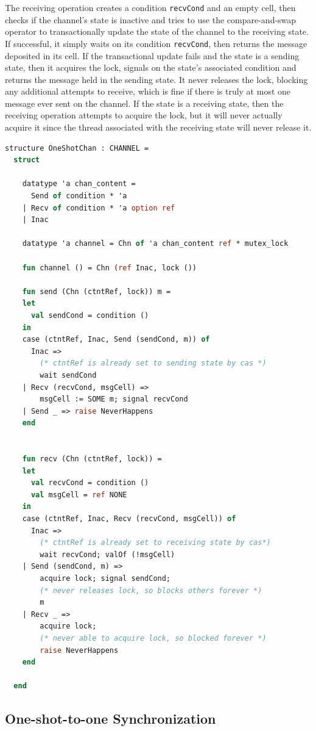 \documentclass[letterpaper, 11pt]{extarticle}
\begin{document}
The receiving operation creates a condition \lstinline{recvCond} and an empty cell,
then checks if the channel's state is inactive and tries to use the
compare-and-swap operator to transactionally update the state of the channel to
the receiving state.  If successful, it simply waits on its condition \lstinline{recvCond},
then returns the message deposited in its cell.
If the transactional update fails and the state is a sending state,
then it acquires the lock, signals on the state's associated condition and returns the message
held in the sending state.  It never releases the lock, blocking any additional attempts to receive,
which is fine if there is truly at most one message ever sent on the channel.
If the state is a receiving state, then the receiving operation attempts to acquire the lock,
but it will never actually acquire it since the thread associated with the receiving state will
never release it.


\begin{lstlisting}[language=ML, mathescape]
  structure OneShotChan : CHANNEL =
  struct

    datatype 'a chan_content =
      Send of condition * 'a
    | Recv of condition * 'a option ref
    | Inac  

    datatype 'a channel = Chn of 'a chan_content ref * mutex_lock

    fun channel () = Chn (ref Inac, lock ())

    fun send (Chn (ctntRef, lock)) m =
    let
      val sendCond = condition ()
    in
    case (ctntRef, Inac, Send (sendCond, m)) of
      Inac =>
        (* ctntRef is already set to sending state by cas *)
        wait sendCond
    | Recv (recvCond, msgCell) =>
        msgCell := SOME m; signal recvCond
    | Send _ => raise NeverHappens
    end


    fun recv (Chn (ctntRef, lock)) =
    let
      val recvCond = condition ()
      val msgCell = ref NONE 
    in
    case (ctntRef, Inac, Recv (recvCond, msgCell)) of
      Inac =>
        (* ctntRef is already set to receiving state by cas*)
        wait recvCond; valOf (!msgCell)
    | Send (sendCond, m) =>
        acquire lock; signal sendCond;
        (* never releases lock, so blocks others forever *)
        m
    | Recv _ =>
        acquire lock;
        (* never able to acquire lock, so blocked forever *)
        raise NeverHappens
    end

  end
\end{lstlisting}


\subsection{One-shot-to-one Synchronization}
\end{document}
